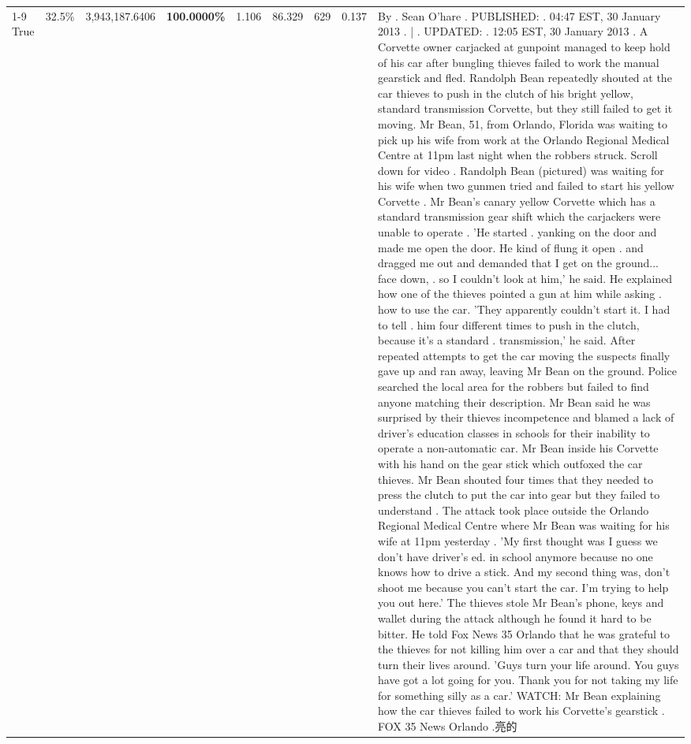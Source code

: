 \begin{table}[H]
\begin{tabular}{lllrlllll}
\cline{1-9} \cline{2-9}
True & 32.5\% & 3,943,187.6406 & \bfseries \color{red} 100.0000\% & 1.106 & 86.329 & 629 & 0.137 & By . Sean O'hare . PUBLISHED: . 04:47 EST, 30 January 2013 . | . UPDATED: . 12:05 EST, 30 January 2013 . A Corvette owner carjacked at gunpoint managed to keep hold of his car after bungling thieves failed to work the manual gearstick and fled. Randolph Bean repeatedly shouted at the car thieves to push in the clutch of his bright yellow, standard transmission Corvette, but they still failed to get it moving. Mr Bean, 51, from Orlando, Florida was waiting to pick up his wife from work at the Orlando Regional Medical Centre at 11pm last night when the robbers struck. Scroll down for video . Randolph Bean (pictured) was waiting for his wife when two gunmen tried and failed to start his yellow Corvette . Mr Bean's canary yellow Corvette which has a standard transmission gear shift which the carjackers were unable to operate . 'He started . yanking on the door and made me open the door. He kind of flung it open . and dragged me out and demanded that I get on the ground... face down, . so I couldn't look at him,' he said. He explained how one of the thieves pointed a gun at him while asking . how to use the car. 'They apparently couldn't start it. I had to tell . him four different times to push in the clutch, because it's a standard . transmission,' he said. After repeated attempts to get the car moving the suspects finally gave up and ran away, leaving Mr Bean on the ground. Police searched the local area for the robbers but failed to find anyone matching their description. Mr Bean said he was surprised by their thieves incompetence and blamed a lack of driver's education classes in schools for their inability to operate a non-automatic car. Mr Bean inside his Corvette with his hand on the gear stick which outfoxed the car thieves. Mr Bean shouted four times that they needed to press the clutch to put the car into gear but they failed to understand . The attack took place outside the Orlando Regional Medical Centre where Mr Bean was waiting for his wife at 11pm yesterday . 'My first thought was I guess we don't have driver's ed. in school anymore because no one knows how to drive a stick. And my second thing was, don't shoot me because you can't start the car. I'm trying to help you out here.' The thieves stole Mr Bean's phone, keys and wallet during the attack although he found it hard to be bitter. He told Fox News 35 Orlando that he was grateful to the thieves for not killing him over a car and that they should turn their lives around. 'Guys turn your life around. You guys have got a lot going for you. Thank you for not taking my life for something silly as a car.' WATCH: Mr Bean explaining how the car thieves failed to work his Corvette's gearstick . FOX 35 News Orlando .亮的 \\

\end{tabular}
\end{table}
